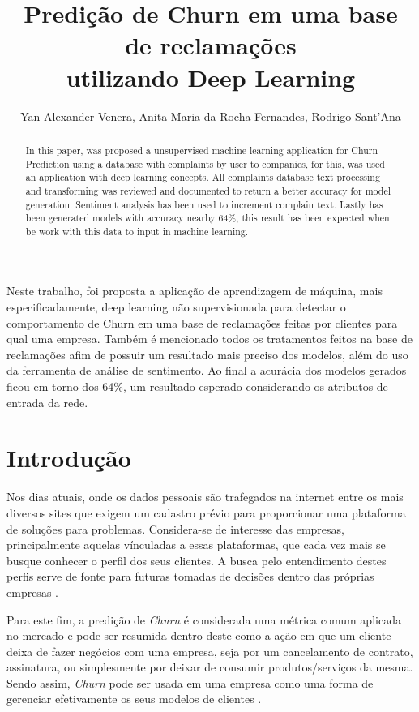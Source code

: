 \documentclass[12pt]{article}
\title{Predição de Churn em uma base de reclamações \\ utilizando Deep Learning}
\author{Yan Alexander Venera, Anita Maria da Rocha Fernandes, Rodrigo Sant'Ana}
\begin{document}
 

\maketitle

\begin{abstract}
In this paper, was proposed a unsupervised machine learning application for Churn Prediction using a database with complaints by user to companies, for this, was used an application with deep learning concepts. All complaints database text processing and transforming was reviewed and documented to return a better accuracy for model generation. Sentiment analysis has been used to increment complain text. Lastly has been generated models with accuracy nearby 64\%, this result has been expected when be work with this data to input in machine learning.
\end{abstract}
     
\begin{resumo} 
Neste trabalho, foi proposta a aplicação de aprendizagem de máquina, mais especificadamente, deep learning não supervisionada para detectar o comportamento de Churn em uma base de reclamações feitas por clientes para qual uma empresa. Também é mencionado todos os tratamentos feitos na base de reclamações afim de possuir um resultado mais preciso dos modelos, além do uso da ferramenta de análise de sentimento. Ao final a acurácia dos modelos gerados ficou em torno dos 64\%, um resultado esperado considerando os atributos de entrada da rede.
\end{resumo}

\section{Introdução}\label{sec:into}

Nos dias atuais, onde os dados pessoais são trafegados na internet entre os mais diversos sites que exigem um cadastro prévio para proporcionar uma plataforma de soluções para problemas. Considera-se de interesse das empresas, principalmente aquelas vínculadas a essas plataformas, que cada vez mais se busque conhecer o perfil dos seus clientes. A busca pelo entendimento destes perfis serve de fonte para futuras tomadas de decisões dentro das próprias empresas \cite{tsai:09}. 

Para este fim, a predição de \emph{Churn} é considerada uma métrica comum aplicada no mercado \cite{amin:18} e pode ser resumida dentro deste como a ação em que um cliente deixa de fazer negócios com uma empresa, seja por um cancelamento de contrato, assinatura, ou simplesmente por deixar de consumir produtos/serviços da mesma. Sendo assim, \emph{Churn} pode ser usada em uma empresa como uma forma de gerenciar efetivamente os seus modelos de clientes \cite{coussement:08}.
\end{document}
